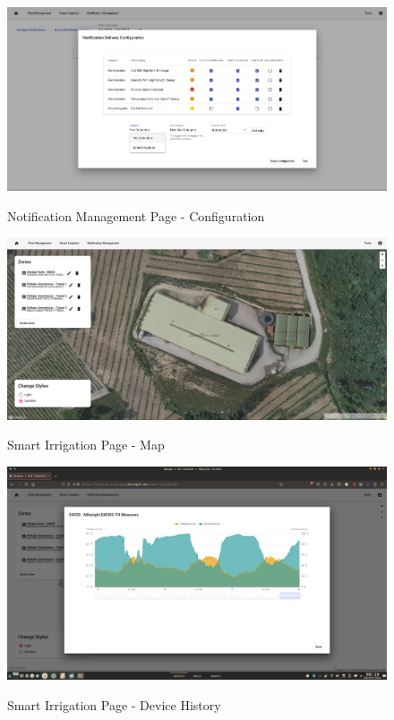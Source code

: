 \begin{figure}[H]
   \centering
   \resizebox{\columnwidth}{!}
   {
      \includegraphics{assets/figures/ui/notification-configuration.png}
   }
   \caption[Notification Management Page - Configuration]{Notification Management Page - Configuration}
   \label{fig:AppendixD2:notificationconfig}
\end{figure}

\begin{figure}[H]
   \centering
   \resizebox{\columnwidth}{!}
   {
      \includegraphics{assets/figures/ui/smart-irrigation-map.png}
   }
   \caption[Smart Irrigation Page - Map]{Smart Irrigation Page - Map}
   \label{fig:AppendixD2:irrigmap}
\end{figure}

\begin{figure}[H]
   \centering
   \resizebox{\columnwidth}{!}
   {
      \includegraphics{assets/figures/ui/smart-irrigation-history.png}
   }
   \caption[Smart Irrigation Page - Device History]{Smart Irrigation Page - Device History}
   \label{fig:AppendixD2:irrighistory}
\end{figure}
